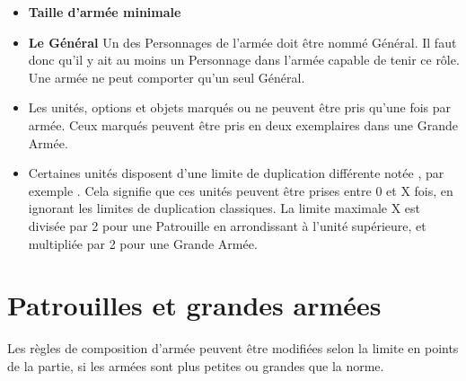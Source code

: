 \begin{itemize}[label={\textbullet}]
\item \textbf{Taille d'armée minimale}\newline
{}
\item \textbf{Le Général}\newline
Un des Personnages de l'armée doit être nommé Général. Il faut donc qu'il y ait au moins un Personnage dans l'armée capable de tenir ce rôle. Une armée ne peut comporter qu'un seul Général.
\item \textbf{}\newline
Les unités, options et objets marqués \oneofakind{} ou \oneperarmy{} ne peuvent être pris qu'une fois par armée. Ceux marqués \oneofakind{} peuvent être pris en deux exemplaires dans une Grande Armée.
\item \textbf{}\newline
Certaines unités disposent d'une limite de duplication différente notée , par exemple . Cela signifie que ces unités peuvent être prises entre 0 et X fois, en ignorant les limites de duplication classiques. La limite maximale X est divisée par 2 pour une Patrouille en arrondissant à l'unité supérieure, et multipliée par 2 pour une Grande Armée.
\end{itemize}

\newpage
\section{Patrouilles et grandes armées}

Les règles de composition d'armée peuvent être modifiées selon la limite en points de la partie, si les armées sont plus petites ou grandes que la norme.

